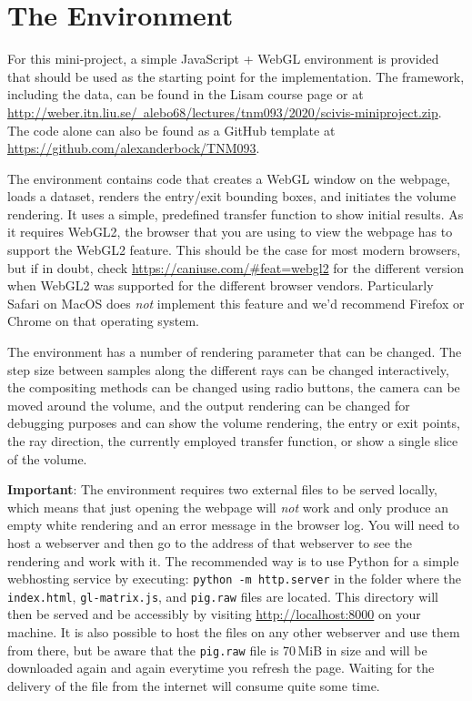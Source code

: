\documentclass{labinstructions}
\begin{document}
\section{The Environment}
For this mini-project, a simple JavaScript + WebGL environment is provided that should be used as the starting point for the implementation.  The framework, including the data, can be found in the Lisam course page or at \href{http://weber.itn.liu.se/~alebo68/lectures/tnm093/2020/scivis-miniproject.zip}{http://weber.itn.liu.se/~alebo68/lectures/tnm093/2020/scivis-miniproject.zip}.  The code alone can also be found as a GitHub template at \href{https://github.com/alexanderbock/TNM093}{https://github.com/alexanderbock/TNM093}.

The environment contains code that creates a WebGL window on the webpage, loads a dataset, renders the entry/exit bounding boxes, and initiates the volume rendering.  It uses a simple, predefined transfer function to show initial results.  As it requires WebGL2, the browser that you are using to view the webpage has to support the WebGL2 feature.  This should be the case for most modern browsers, but if in doubt, check \href{https://caniuse.com/\#feat=webgl2}{https://caniuse.com/\#feat=webgl2} for the different version when WebGL2 was supported for the different browser vendors.  Particularly Safari on MacOS does \emph{not} implement this feature and we'd recommend Firefox or Chrome on that operating system.

The environment has a number of rendering parameter that can be changed.  The step size between samples along the different rays can be changed interactively, the compositing methods can be changed using radio buttons, the camera can be moved around the volume, and the output rendering can be changed for debugging purposes and can show the volume rendering, the entry or exit points, the ray direction, the currently employed transfer function, or show a single slice of the volume.

\textbf{Important}: The environment requires two external files to be served locally, which means that just opening the webpage will \emph{not} work and only produce an empty white rendering and an error message in the browser log.  You will need to host a webserver and then go to the address of that webserver to see the rendering and work with it.  The recommended way is to use Python for a simple webhosting service by executing: \texttt{python -m http.server} in the folder where the \texttt{index.html}, \texttt{gl-matrix.js}, and \texttt{pig.raw} files are located.  This directory will then be served and be accessibly by visiting \href{http://localhost:8000}{http://localhost:8000} on your machine.  It is also possible to host the files on any other webserver and use them from there, but be aware that the \texttt{pig.raw} file is 70\,MiB in size and will be downloaded again and again everytime you refresh the page.  Waiting for the delivery of the file from the internet will consume quite some time.
\end{document}
